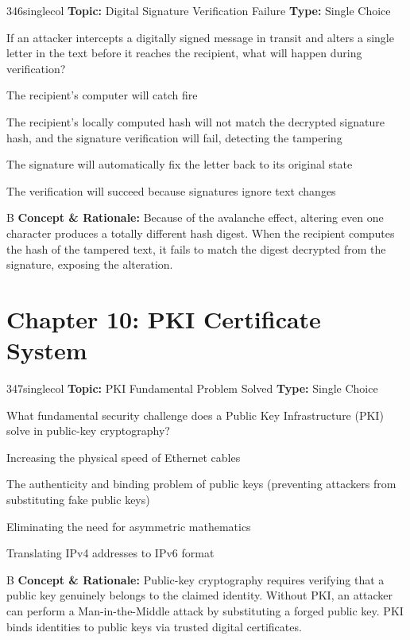 \begin{qcard}{346}{singlecol}
\textcolor{darkslate!75}{\small\textbf{Topic:} Digital Signature Verification Failure \hfill \textbf{Type:} Single Choice}\vspace{0.4em}\par
If an attacker intercepts a digitally signed message in transit and alters a single letter in the text before it reaches the recipient, what will happen during verification?
\begin{qoptions}
\item The recipient's computer will catch fire
\item The recipient's locally computed hash will not match the decrypted signature hash, and the signature verification will fail, detecting the tampering
\item The signature will automatically fix the letter back to its original state
\item The verification will succeed because signatures ignore text changes
\end{qoptions}
\end{qcard}
\nopagebreak
\begin{explainbox}{B}
\textbf{Concept \& Rationale:} Because of the avalanche effect, altering even one character produces a totally different hash digest. When the recipient computes the hash of the tampered text, it fails to match the digest decrypted from the signature, exposing the alteration.
\end{explainbox}

\section{Chapter 10: PKI Certificate System}

\begin{qcard}{347}{singlecol}
\textcolor{darkslate!75}{\small\textbf{Topic:} PKI Fundamental Problem Solved \hfill \textbf{Type:} Single Choice}\vspace{0.4em}\par
What fundamental security challenge does a Public Key Infrastructure (PKI) solve in public-key cryptography?
\begin{qoptions}
\item Increasing the physical speed of Ethernet cables
\item The authenticity and binding problem of public keys (preventing attackers from substituting fake public keys)
\item Eliminating the need for asymmetric mathematics
\item Translating IPv4 addresses to IPv6 format
\end{qoptions}
\end{qcard}
\nopagebreak
\begin{explainbox}{B}
\textbf{Concept \& Rationale:} Public-key cryptography requires verifying that a public key genuinely belongs to the claimed identity. Without PKI, an attacker can perform a Man-in-the-Middle attack by substituting a forged public key. PKI binds identities to public keys via trusted digital certificates.
\end{explainbox}


